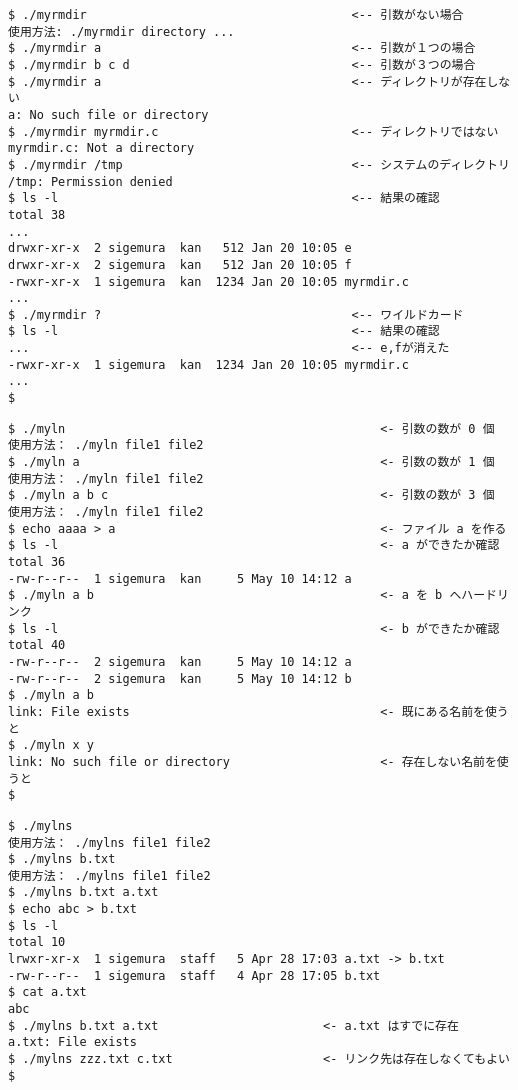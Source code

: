 \documentclass[a4j,twcolumn,11pt,nomag]{ltjarticle}      %
\begin{document}
\begin{enumerate}
\begin{lstlisting}[caption=myrmdirの実行例（動作テスト！！）]
$ ./myrmdir                                     <-- 引数がない場合
使用方法: ./myrmdir directory ...
$ ./myrmdir a                                   <-- 引数が１つの場合
$ ./myrmdir b c d                               <-- 引数が３つの場合
$ ./myrmdir a                                   <-- ディレクトリが存在しない
a: No such file or directory
$ ./myrmdir myrmdir.c                           <-- ディレクトリではない
myrmdir.c: Not a directory
$ ./myrmdir /tmp                                <-- システムのディレクトリ
/tmp: Permission denied
$ ls -l                                         <-- 結果の確認
total 38
...
drwxr-xr-x  2 sigemura  kan   512 Jan 20 10:05 e
drwxr-xr-x  2 sigemura  kan   512 Jan 20 10:05 f
-rwxr-xr-x  1 sigemura  kan  1234 Jan 20 10:05 myrmdir.c
...
$ ./myrmdir ?                                   <-- ワイルドカード
$ ls -l                                         <-- 結果の確認
...                                             <-- e,fが消えた
-rwxr-xr-x  1 sigemura  kan  1234 Jan 20 10:05 myrmdir.c
...
$
\end{lstlisting}

\begin{lstlisting}[caption=mylnの実行例（動作テスト！！）]
$ ./myln                                            <- 引数の数が 0 個
使用方法： ./myln file1 file2
$ ./myln a                                          <- 引数の数が 1 個
使用方法： ./myln file1 file2
$ ./myln a b c                                      <- 引数の数が 3 個
使用方法： ./myln file1 file2
$ echo aaaa > a                                     <- ファイル a を作る
$ ls -l                                             <- a ができたか確認
total 36
-rw-r--r--  1 sigemura  kan     5 May 10 14:12 a
$ ./myln a b                                        <- a を b へハードリンク
$ ls -l                                             <- b ができたか確認
total 40
-rw-r--r--  2 sigemura  kan     5 May 10 14:12 a
-rw-r--r--  2 sigemura  kan     5 May 10 14:12 b
$ ./myln a b
link: File exists                                   <- 既にある名前を使うと
$ ./myln x y
link: No such file or directory                     <- 存在しない名前を使うと
$
\end{lstlisting}

\begin{lstlisting}[caption=mylnsの実行例（動作テスト！！）]
$ ./mylns
使用方法： ./mylns file1 file2
$ ./mylns b.txt
使用方法： ./mylns file1 file2
$ ./mylns b.txt a.txt
$ echo abc > b.txt
$ ls -l
total 10
lrwxr-xr-x  1 sigemura  staff   5 Apr 28 17:03 a.txt -> b.txt
-rw-r--r--  1 sigemura  staff   4 Apr 28 17:05 b.txt
$ cat a.txt
abc
$ ./mylns b.txt a.txt                       <- a.txt はすでに存在
a.txt: File exists
$ ./mylns zzz.txt c.txt                     <- リンク先は存在しなくてもよい
$ 
\end{lstlisting}


\end{enumerate}
\end{document}
